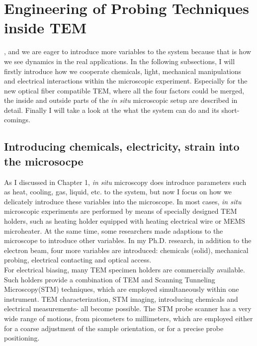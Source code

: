 

\chapter{Engineering of Probing Techniques inside TEM}

, and we are eager to introduce more variables to the system because that is how we see dynamics in the real applications.
In the following subsections, I will firstly introduce how we cooperate chemicals, light, mechanical manipulations and electrical interactions within the microscopic experiment. 
Especially for the new optical fiber compatible TEM, where all the four factors could be merged, the inside and outside parts of the \emph{in situ} microscopic setup are described in detail. 
Finally I will take a look at the what the system can do and its short-comings. 

\section{Introducing chemicals, electricity, strain into the microsocpe}

As I discussed in Chapter 1, \emph{in situ} microscopy does introduce parameters such as heat, cooling, gas, liquid, etc. to the system, but now I focus on how we delicately introduce these variables into the  microscope. In most cases, {\em in situ} microscopic experiments are performed by means of specially designed TEM holders, such as heating holder equipped with heating electrical wire or MEMS microheater. At the same time, some researchers made adaptions to the  microscope to introduce other variables. In my Ph.D. research, in addition to the electron beam, four more variables are introduced: chemicals (solid), mechanical probing, electrical contacting and optical access. \\

For electrical biasing, many TEM specimen holders are commercially available. Such holders provide a combination of TEM and Scanning Tunneling Microscopy(STM) techniques, which are employed simultaneously within one instrument. TEM characterization, STM imaging, introducing chemicals and electrical measurements- all become possible. The STM probe scanner has a very wide range of motions, from picometers to millimeters, which are employed either for a coarse adjustment of the sample orientation, or for a precise probe positioning. \\


